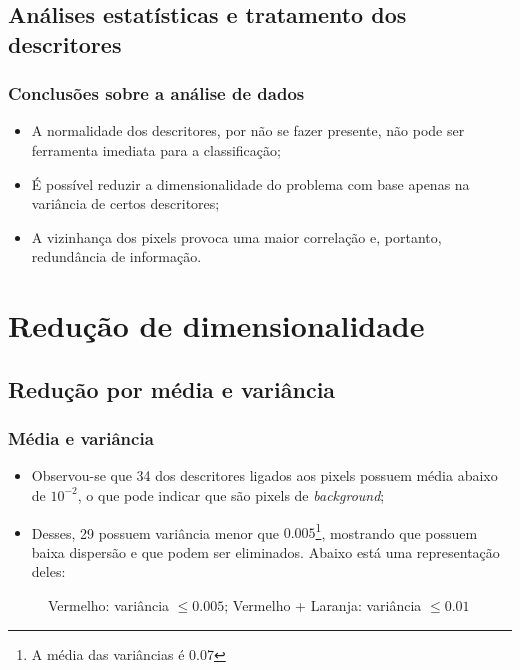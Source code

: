 \subsection[Subsection]{Análises estatísticas e tratamento
dos descritores}


\begin{frame}
	\frametitle{Conclusões sobre a análise de dados}
	\begin{itemize}
		\item A normalidade dos descritores, por não se fazer presente, não pode ser
		ferramenta imediata para a classificação;
		\item É possível reduzir a dimensionalidade do problema
		com base apenas na variância de certos descritores;
		\item A vizinhança dos pixels provoca uma maior correlação e,
		portanto, redundância de informação.
	\end{itemize}
\end{frame}


\section[Redução de dimensionalidade]{Redução de dimensionalidade}

\subsection[Redução por média e variância]{Redução por média e variância}
\begin{frame}
	\frametitle{Média e variância}
	\begin{itemize}
		\item Observou-se que 34 dos descritores ligados
		aos pixels possuem média abaixo de $10^{-2}$, o que
		pode indicar que são pixels de \emph{background};
		\item Desses, 29 possuem variância menor que $0.005$\footnote{A média das variâncias é 0.07}, mostrando
		que possuem baixa dispersão e que podem ser eliminados. Abaixo
		está uma representação deles:
	\end{itemize}
	
	\begin{center}
	\begin{figure}
		\caption{\footnotesize Vermelho: variância $\leq 0.005$; Vermelho + Laranja: variância $\leq 0.01$}
	\end{figure}
	\end{center}
\end{frame}

